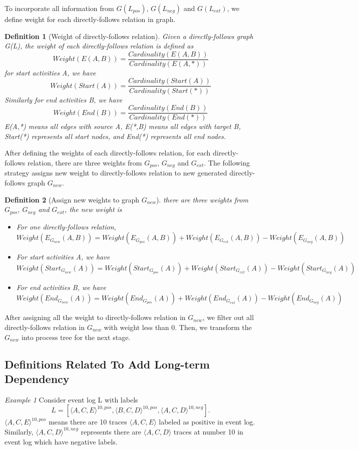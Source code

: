 \documentclass[]{article}
\newtheorem{mydef}{Definition}[section]
\begin{document}
To incorporate all information from  $G(L_{pos})$, $G(L_{neg})$ and $G(L_{ext})$, we define  weight for each directly-follows relation in graph. 
\begin{mydef}[Weight of directly-follows relation]
	Given a directly-follows graph G(L), the weight of each directly-follows relation is defined as \[ Weight(E(A,B)) = \frac{Cardinality(E(A,B))}{Cardinality(E(A,*))}  \] 
	for start activities A, we have 
	\[ Weight(Start(A)) = \frac{Cardinality(Start(A))}{Cardinality(Start(*))} \]
	Similarly for end activities B, we have
	\[ Weight(End(B)) = \frac{Cardinality(End(B))}{Cardinality(End(*))} \]
	E(A,*) means all edges with source A, E(*,B) means all edges with target B, Start(*) represents all start nodes, and End(*) represents all end nodes.
\end{mydef}
After defining the weights of each directly-follows relation, for each directly-follows relation, there are three weights from $G_{pos}$, $G_{neg}$ and $G_{ext}$. The following strategy assigns new weight to directly-follows relation to new generated directly-follows graph $G_{new}$.
\begin{mydef}[Assign new weights to graph $G_{new}$]
	there are three weights from $G_{pos}$, $G_{neg}$ and $G_{ext}$, the new weight is 
	\begin{itemize}
		\item For one directly-follows relation, \[ Weight(E_{G_{new}}(A,B)) = Weight(E_{G_{pos}}(A,B)) + Weight(E_{G_{ext}}(A,B)) - Weight(E_{G_{neg}}(A,B))\]
		\item For start activities A, we have 
		\[ Weight(Start_{G_{new}}(A)) = Weight(Start_{G_{pos}}(A)) + Weight(Start_{G_{ext}}(A)) - Weight(Start_{G_{neg}}(A)) \]
		\item For end activities B, we have
		\[ Weight(End_{G_{new}}(A)) = Weight(End_{G_{pos}}(A)) + Weight(End_{G_{ext}}(A)) - Weight(End_{G_{neg}}(A)) \]
	\end{itemize}
\end{mydef}
After assigning all the weight to directly-follows relation in $G_{new}$, we filter out all directly-follows relation in $G_{new}$ with weight less than 0. 
Then, we transform the $G_{new}$ into process tree for the next stage.

\subsection{Definitions Related To Add Long-term Dependency}
\textit{Example 1} Consider event log L with labels \[L =[\langle A,C,E \rangle^{10,pos}, \langle B,C,D \rangle^{10,pos}, \langle A,C,D \rangle^{10,neg}]. \] $\langle A,C,E \rangle^{10,pos}$ means there are 10 traces $\langle A,C,E \rangle$ labeled as positive in event log. Similarly, $\langle A,C,D \rangle^{10,neg}$ represents there are $\langle A,C,D \rangle$ traces at number 10 in event log which have negative labels. 
\end{document}
